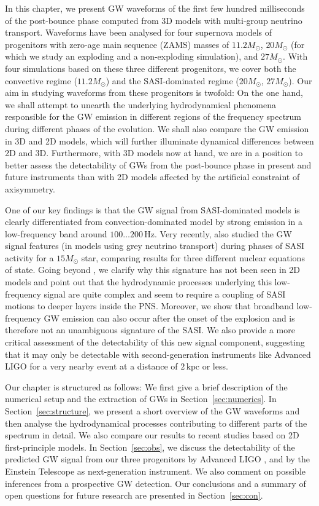In this chapter, we present GW waveforms of the
first few hundred milliseconds of the post-bounce phase computed from 3D
models with multi-group neutrino transport. Waveforms have been
analysed for four supernova models of progenitors with zero-age main
sequence (ZAMS) masses of $11.2 M_\odot$, $20 M_\odot$  (for which
we study an exploding and a non-exploding simulation), and $27
M_\odot$. With four simulations based on these three different
progenitors, we cover both the convective
regime ($11.2 M_\odot$) and the SASI-dominated regime ($20 M_\odot$,
$27 M_\odot$). Our aim in studying waveforms from these progenitors is
twofold: On the one hand, we shall attempt to unearth the underlying
hydrodynamical phenomena responsible for the GW emission in different 
regions of the frequency spectrum during different
phases of the evolution.  We shall also compare the GW
emission in 3D and 2D models, which will further illuminate dynamical
differences between 2D and 3D. Furthermore, with 3D models now
at hand, we are in a position to better assess the detectability of
GWs from the post-bounce phase in present and future
instruments than with 2D models affected by the artificial constraint
of axisymmetry.

One of our key findings is that the GW signal 
from SASI-dominated models is clearly differentiated from convection-dominated model 
by strong emission in a low-frequency band around $100 \ldots 200 \, \mathrm{Hz}$. 
Very recently, \cite{kuroda_16} also studied the GW signal 
features (in models using grey neutrino transport) during phases of SASI activity for a $15 M_\odot$ star,
comparing results for three different nuclear equations of state. Going beyond \cite{kuroda_16}, we clarify why this 
signature has not been seen in 2D models and point out that the hydrodynamic processes underlying 
this low-frequency signal are quite complex and seem to require a coupling of SASI motions to deeper 
layers inside the PNS. Moreover, we show that broadband low-frequency GW emission 
can also occur after the onset of the explosion and is therefore not an unambiguous signature of 
the SASI. We also provide a more critical assessment of the detectability of this new signal component, 
suggesting that it may only be detectable with second-generation instruments like Advanced LIGO for a very 
nearby event at a distance of $2 \, \mathrm{kpc}$ or less.

Our chapter is structured as follows: We first give a brief
description of the numerical setup and the extraction of
GWs in Section~\ref{sec:numerics}.
In Section~\ref{sec:structure}, we present a short overview
of the GW waveforms and then analyse the hydrodynamical
processes contributing to different parts of the spectrum
in detail. We also compare our results to recent studies
based on 2D first-principle models.
In Section~\ref{sec:obs}, we discuss the detectability
of the predicted GW signal from our
three progenitors by Advanced LIGO \citep{advligo_15},
and by the Einstein Telescope \citep{et_12} as next-generation
instrument. We also comment on possible inferences
from a prospective GW detection. Our
conclusions and a summary of open questions for
future research are presented in Section~\ref{sec:con}.

